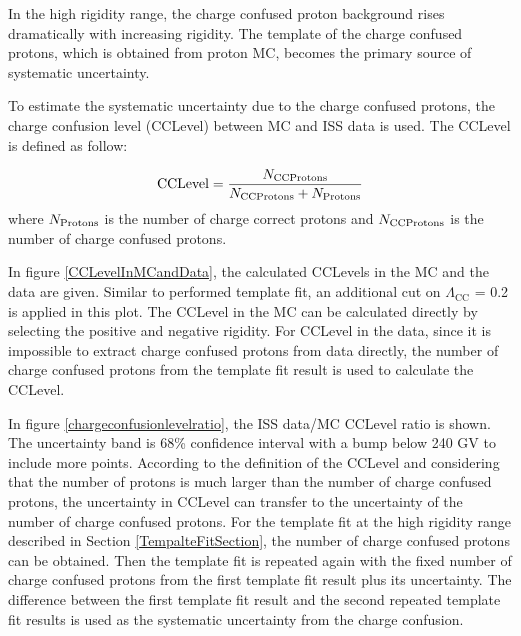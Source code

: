 In the high rigidity range, the charge confused proton background rises dramatically with increasing rigidity. The template of the charge confused protons, which is obtained from proton MC, becomes the primary source of systematic uncertainty. \par

To estimate the systematic uncertainty due to the charge confused protons, the charge confusion level (CCLevel) between MC and ISS data is used. The CCLevel is defined as follow: 

\begin{equation}
{\rm{CCLevel}} = \frac{N_{\rm{CC Protons}}}{N_{\rm{CC Protons}}+N_{\rm{Protons}}} 
\end{equation}
where $N_{\rm{Protons}}$ is the number of charge correct protons and $N_{\rm{CC Protons}}$ is the number of charge confused protons. 

In figure \ref{CCLevelInMCandData}, the calculated CCLevels in the MC and the data are given. Similar to performed template fit, an additional cut on $\Lambda_\mathrm{CC}$ = 0.2 is applied in this plot. The CCLevel in the MC can be calculated directly by selecting the positive and negative rigidity. For CCLevel in the data, since it is impossible to extract charge confused protons from data directly, the number of charge confused protons from the template fit result is used to calculate the CCLevel.  \par

In figure \ref{chargeconfusionlevelratio}, the ISS data/MC CCLevel ratio is shown. The uncertainty band is 68\% confidence interval with a bump below 240 GV to include more points. According to the definition of the CCLevel and considering that the number of protons is much larger than the number of charge confused protons, the uncertainty in CCLevel can transfer to the uncertainty of the number of charge confused protons. For the template fit at the high rigidity range described in Section \ref{TempalteFitSection}, the number of charge confused protons can be obtained. Then the template fit is repeated again with the fixed number of charge confused protons from the first template fit result plus its uncertainty. The difference between the first template fit result and the second repeated template fit results is used as the systematic uncertainty from the charge confusion.  \par


